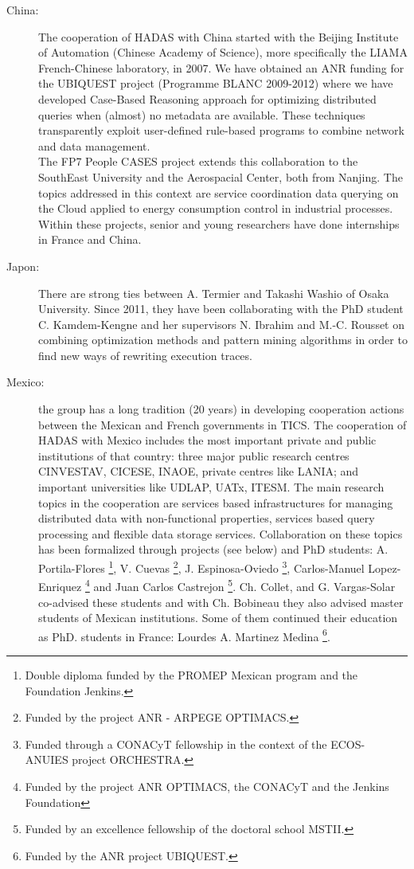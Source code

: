 \begin{description}

\item[China:] The cooperation of HADAS with China started with the Beijing Institute of Automation (Chinese Academy of Science), more specifically the LIAMA French-Chinese laboratory, in 2007. We have obtained an ANR funding for the UBIQUEST project (Programme BLANC 2009-2012) where we have developed Case-Based Reasoning approach for optimizing distributed queries when (almost) no metadata are available. These techniques transparently exploit user-defined rule-based programs to combine network and data management.\\
The FP7 People CASES project extends this collaboration to the SouthEast University and the Aerospacial Center, both from Nanjing. The topics addressed in this context are service coordination data querying on the  Cloud applied to energy consumption control in industrial processes. Within these projects, senior and young researchers have done internships in France and China.

\item[Japon:] 
There are strong ties between A. Termier and Takashi Washio of Osaka University. Since 2011, they have been collaborating with the PhD student C. Kamdem-Kengne and her supervisors N. Ibrahim and M.-C. Rousset on combining optimization methods and pattern mining algorithms in order to find new ways of rewriting execution traces.

\item[Mexico:] the group has a long tradition (20 years) in developing cooperation actions between the Mexican and French governments in TICS. 
The cooperation of HADAS with Mexico includes the most important private and public institutions of that country: three major public research centres CINVESTAV, CICESE, INAOE, private centres like LANIA; and important universities like UDLAP, UATx, ITESM. 
The main research topics in the cooperation are services based infrastructures for managing distributed data with non-functional properties, services based query processing and flexible data storage services.  Collaboration on these topics has been formalized through projects (see below) and PhD students: A. Portila-Flores \footnote{Double diploma funded by the PROMEP Mexican program and the Foundation Jenkins.}, V. Cuevas \footnote{Funded by the project ANR - ARPEGE OPTIMACS.}, J. Espinosa-Oviedo \footnote{Funded through a CONACyT fellowship in the context of the ECOS-ANUIES project ORCHESTRA.}, Carlos-Manuel Lopez-Enriquez \footnote{Funded by the project ANR OPTIMACS, the CONACyT and the Jenkins Foundation} and Juan Carlos Castrejon \footnote{Funded by an excellence fellowship of the doctoral school MSTII.}.  Ch. Collet, and G. Vargas-Solar co-advised these students and with Ch. Bobineau they also advised master students of Mexican institutions. Some of them continued their education as PhD. students in France: Lourdes A. Martinez Medina \footnote{Funded by the ANR project UBIQUEST.}. 


\end{description}

